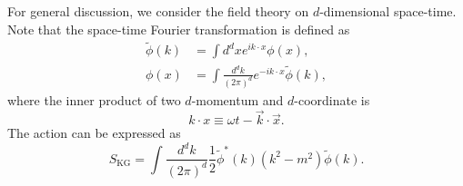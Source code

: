 For general discussion, we consider the field theory on $d$-dimensional space-time.
Note that the space-time Fourier transformation is defined as
\begin{equation}
\begin{aligned}
	\tilde{\phi}(k) &= \int d^{d}x e^{ik\cdot x} \phi(x), \\ 
	\phi(x) &= \int \frac{d^{d}k}{(2\pi)^{d}} e^{-ik\cdot x}\tilde{\phi}(k),
\end{aligned}
\end{equation}
where the inner product of two $d$-momentum and $d$-coordinate is
\begin{equation}
	k\cdot x \equiv \omega t-\vec k\cdot \vec x.
\end{equation}
The action can be expressed as
\begin{equation}
	S_{\mathrm{KG}} = \int \frac{d^d k}{(2\pi)^d} \frac{1}{2} \tilde{\phi}^*(k)(k^2-m^2)\tilde{\phi}(k).
\end{equation}

